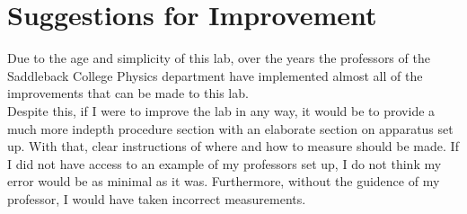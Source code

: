 \chapter{Suggestions for Improvement}

\noindent Due to the age and simplicity of this lab, over the years the professors
of the Saddleback College Physics department have implemented almost all of the
improvements that can be made to this lab.\\

\noindent Despite this, if I were to improve the lab in any way, it would be to 
provide a much more indepth procedure section with an elaborate section on 
apparatus set up. With that, clear instructions of where and how to measure
should be made. If I did not have access to an example of my professors 
set up, I do not think my error would be as minimal as it was. Furthermore,
without the guidence of my professor, I would have taken incorrect measurements.\\